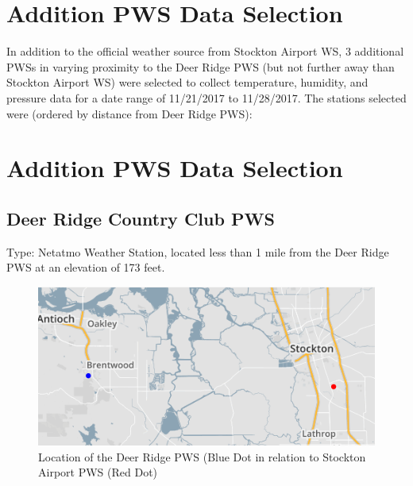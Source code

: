\documentclass[sigconf]{acmart}
\begin{document}
\section{Addition PWS Data Selection}

In addition to the official weather source from Stockton Airport WS, 3 additional PWSs in varying proximity to the Deer Ridge PWS (but not further away than Stockton Airport WS) were selected to collect temperature, humidity, and pressure data for a date range of 11/21/2017 to 11/28/2017. The stations selected were (ordered by distance from Deer Ridge PWS):

\section{Addition PWS Data Selection} 

\subsection{Deer Ridge Country Club PWS}

Type: Netatmo Weather Station, located less than 1 mile from the Deer Ridge PWS at an elevation of 173 feet.

\begin{figure}[htb]
    \centering
    \includegraphics[width=\columnwidth]{images/DR_Stockton.PNG}
    \caption{Location of the Deer Ridge PWS (Blue Dot in relation to Stockton Airport PWS (Red Dot)}
    \label{Image 1: Deer Ridge}
\end{figure}
\end{document}
